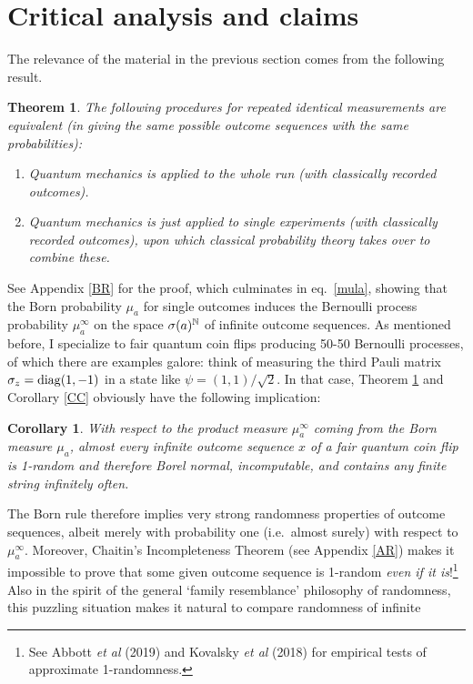 \documentclass[12pt]{article}
\numberwithin{equation}{section}
\newcommand{\er}{\eqref}
\newcommand{\N}{{\mathbb N}} \newcommand{\R}{{\mathbb R}}
\newtheorem{theorem}[definition]{Theorem}
\newtheorem{corollary}[definition]{Corollary}
\begin{document}
 \section{Critical analysis and claims}\label{CAC}
 The relevance of the material in the previous section comes from the following result.
  \begin{theorem}\label{ET}
  The following procedures for repeated identical measurements  are equivalent (in giving the same possible outcome sequences with the same  probabilities):
 \begin{enumerate}
 \item {Quantum mechanics is  applied to the whole run (with classically recorded outcomes).}
\item {Quantum mechanics is just applied to single experiments (with classically recorded outcomes), upon which classical probability theory takes over to combine these.} 
\end{enumerate}
 \end{theorem}
See Appendix \ref{BR} for the proof, which culminates in eq.\ \er{mula}, showing that the Born probability $\mu_a$ for single outcomes induces the Bernoulli process probability $\mu_a^{\infty}$ on the space $\sg(a)^{\N}$ of infinite outcome sequences. As mentioned before, I specialize to fair quantum coin flips producing 50-50 Bernoulli processes, of which there are examples galore: think of
measuring the third Pauli matrix $\sigma_z=\mathrm{diag}(1,-1)$ in a state like $\psi=(1,1)/\sqrt{2}$. In that case,
Theorem \ref{ET} and Corollary \ref{CC} obviously have the following implication:
\begin{corollary}\label{CC2}
With respect to the product measure
 $\mu_a^{\infty}$ coming from the Born measure $\mu_a$, almost every infinite outcome sequence $x$ of a  fair  quantum coin flip is 1-random and therefore Borel normal, incomputable,
  and contains any finite string infinitely often.
 \end{corollary}
The Born rule therefore implies very strong randomness properties of outcome sequences, albeit merely with probability one (i.e.\ almost surely) with respect to $\mu_a^{\infty}$. Moreover, Chaitin's Incompleteness Theorem (see Appendix \ref{AR}) makes it impossible to prove that some given outcome sequence is 1-random \emph{even if it is}!\footnote{See
Abbott \emph{et al} (2019) and Kovalsky \emph{et al} (2018) for empirical tests of approximate 1-randomness.}
Also  in the spirit of the general `family resemblance' philosophy of randomness, this puzzling situation makes it natural to compare  randomness of infinite 
\end{document}
